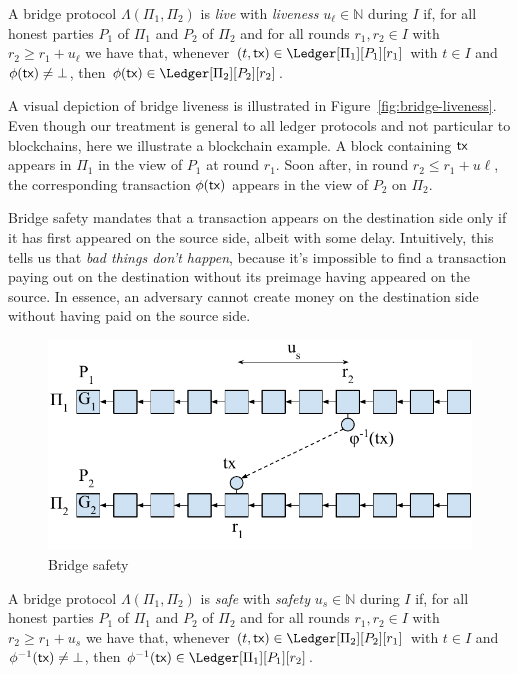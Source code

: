 \begin{definition}
  A bridge protocol $\Lambda(\Pi_1, \Pi_2)$ is \emph{live} with \emph{liveness} $u_\ell \in \mathbb{N}$
  during $I$ if, for all honest parties $P_1$ of $\Pi_1$ and $P_2$ of $\Pi_2$ and for all rounds
  $r_1, r_2 \in I$ with $r_2 \geq r_1 + u_\ell$ we have that, whenever $(t, \tx) \in \Ledger[\Pi_1][P_1][r_1]$
  with $t \in I$ and $\phi(\textsf{tx}) \neq \bot$, then $\phi(\tx) \in \Ledger[\Pi_2][P_2][r_2]$.
\end{definition}

A visual depiction of bridge liveness is illustrated in Figure~\ref{fig:bridge-liveness}.
Even though our treatment is general to all ledger protocols and not particular to blockchains,
here we illustrate a blockchain example. A block containing $\textsf{tx}$ appears in $\Pi_1$ in the view
of $P_1$ at round $r_1$. Soon after, in round $r_2 \leq r_1 + u\ell$, the corresponding transaction
$\phi(\textsf{tx})$ appears in the view of $P_2$ on $\Pi_2$.

Bridge safety mandates that a transaction appears on the destination side only if it has first
appeared on the source side, albeit with some delay. Intuitively, this tells us that \emph{bad
things don't happen}, because it's impossible to find a transaction paying out on the
destination without its preimage having appeared on the source. In essence, an adversary cannot create money
on the destination side without having paid on the source side.

\begin{figure}
    \center
    \includegraphics[width=0.8\columnwidth]{figures/bridge-safety.pdf}
    \caption{Bridge safety}
    \label{fig:bridge-safety}
\end{figure}

\begin{definition}
  A bridge protocol $\Lambda(\Pi_1, \Pi_2)$ is \emph{safe} with \emph{safety} $u_s \in \mathbb{N}$
  during $I$ if, for all honest parties $P_1$ of $\Pi_1$ and $P_2$ of $\Pi_2$ and for all rounds
  $r_1, r_2 \in I$ with $r_2 \geq r_1 + u_s$ we have that, whenever $(t, \tx) \in \Ledger[\Pi_2][P_2][r_1]$
  with $t \in I$ and $\phi^{-1}(\textsf{tx}) \neq \bot$, then
  $\phi^{-1}(\tx) \in \Ledger[\Pi_1][P_1][r_2]$.
\end{definition}

